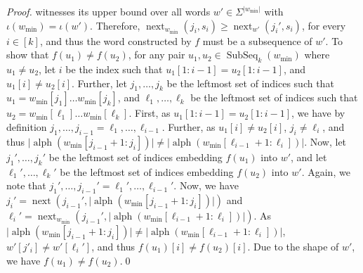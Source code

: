 \documentclass[runningheads,UKenglish,cleveref, autoref, thm-restate]{llncs}
\DeclareMathOperator{\alphabet}{alph}
\DeclareMathOperator\ScatFact{SubSeq}
\DeclareMathOperator{\nextAlphPos}{next}
\begin{document}
\begin{proof}
	witnesses its upper bound over all words $w'\in\Sigma^{\vert w_{\min} \vert}$ with $\iota(w_{\min}) = \iota(w')$. Therefore, $\nextAlphPos_{w_{\min}}(j_i,s_i) \geq \nextAlphPos_{w'}(j_i',s_i)$, for every $i \in [k]$, and thus the word constructed by $f$ must be a subsequence of $w'$. To show that $f(u_1) \neq f(u_2)$, for any pair $u_1, u_2 \in \ScatFact_k(w_{\min})$ where $u_1 \neq u_2$, let $i$ be the index such that $u_1[1: i - 1] = u_2[1 : i - 1]$, and $u_1[i] \neq u_2[i]$. Further, let $j_1, \dots, j_k$ be the leftmost set of indices such that $u_1 = w_{\min}[j_1] \dots w_{\min}[j_k]$, and $\ell_1, \dots, \ell_k$ be the leftmost set of indices such that $u_2 = w_{\min}[\ell_1] \dots w_{\min}[\ell_k]$. First, as $u_1[1:i - 1] = u_2[1:i - 1]$, we have by definition $j_1, \dots, j_{i - 1} = \ell_1, \dots, \ell_{i - 1}$. Further, as $u_1[i] \neq u_2[i]$, $j_i \neq \ell_i$, and thus $\vert \alphabet(w_{\min}[j_{i - 1} + 1 : j_{i}]) \vert \neq \vert \alphabet(w_{\min}[\ell_{i - 1} + 1 : \ell_i]) \vert$. Now, let $j_1', \dots, j_k'$ be the leftmost set of indices embedding $f(u_1)$ into $w'$, and let $\ell_1', \dots, \ell_k'$ be the leftmost set of indices embedding $f(u_2)$ into $w'$. Again, we note that $j_1', \dots, j_{i - 1}' = \ell_1', \dots, \ell_{i - 1}'$. Now, we have $j_i' = \nextAlphPos(j_{i - 1}', \vert \alphabet(w_{\min}[j_{i - 1} + 1 : j_{i}]) \vert)$ and $\ell_i' =  \nextAlphPos_{w_{\min}}(j_{i - 1}', \vert \alphabet(w_{\min}[\ell_{i - 1} + 1 : \ell_i]) \vert)$. As $\vert \alphabet(w_{\min}[j_{i - 1} + 1 : j_{i}]) \vert \neq \vert \alphabet(w_{\min}[\ell_{i - 1} + 1 : \ell_i]) \vert$, $w'[j'_i] \neq w'[\ell_i']$, and thus $f(u_1)[i] \neq f(u_2)[i]$. Due to the shape of $w'$, we have $f(u_1) \neq f(u_2)$.\qed

\end{proof}
\end{document}
